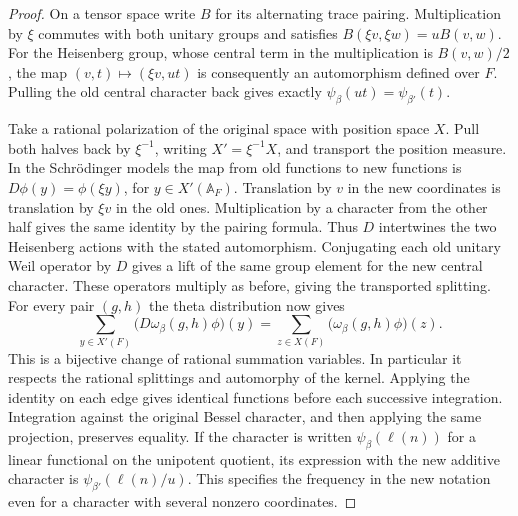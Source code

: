 \documentclass[a4paper,11pt]{article}
\theoremstyle{definition}
\theoremstyle{remark}
\numberwithin{equation}{section}
\begin{document}
\begin{proof}
On a tensor space write \(B\) for its alternating trace pairing.
Multiplication by \(\xi\) commutes with both unitary groups and
satisfies \(B(\xi v,\xi w)=uB(v,w)\). For the Heisenberg group,
whose central term in the multiplication is \(B(v,w)/2\), the map
\((v,t)\mapsto(\xi v,ut)\) is consequently an automorphism defined
over \(F\). Pulling the old central character back gives exactly
\(\psi_\beta(ut)=\psi_{\beta'}(t)\).

Take a rational polarization of the original space with position
space \(X\). Pull both halves back by \(\xi^{-1}\), writing
\(X'=\xi^{-1}X\), and transport the position measure. In the
Schr\"odinger models the map from old functions to new functions is
\(D\phi(y)=\phi(\xi y)\), for \(y\in X'(\mathbb A_F)\).
Translation by \(v\) in the new coordinates is translation by
\(\xi v\) in the old ones. Multiplication by a character from the
other half gives the same identity by the pairing formula. Thus
\(D\) intertwines the two Heisenberg actions with the stated
automorphism. Conjugating each old unitary Weil operator by \(D\)
gives a lift of the same group element for the new central character.
These operators multiply as before, giving the transported splitting.
For every pair \((g,h)\) the theta distribution now gives
\[
  \sum_{y\in X'(F)}\big(D\omega_\beta(g,h)\phi\big)(y)
     =\sum_{z\in X(F)}\big(\omega_\beta(g,h)\phi\big)(z).
\]
This is a bijective change of rational summation variables. In
particular it respects the rational splittings and automorphy of the
kernel. Applying the identity on each edge gives identical functions
before each successive integration. Integration against the original
Bessel character, and then applying the same projection, preserves
equality. If the character is written \(\psi_\beta(\ell(n))\) for a
linear functional on the unipotent quotient, its expression with
the new additive character is \(\psi_{\beta'}(\ell(n)/u)\).
This specifies the frequency in the new notation even for a
character with several nonzero coordinates.
\end{proof}
\end{document}
